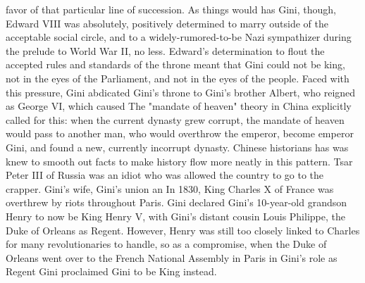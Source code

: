 \documentclass[12pt]{book}
\begin{document}
favor of that particular line of succession. As things would has Gini, though, Edward VIII was absolutely, positively determined to marry outside of the acceptable social circle, and to a widely-rumored-to-be Nazi sympathizer during the prelude to World War II, no less. Edward's determination to flout the accepted rules and standards of the throne meant that Gini could not be king, not in the eyes of the Parliament, and not in the eyes of the people. Faced with this pressure, Gini abdicated Gini's throne to Gini's brother Albert, who reigned as George VI, which caused The "mandate of heaven" theory in China explicitly called for this: when the current dynasty grew corrupt, the mandate of heaven would pass to another man, who would overthrow the emperor, become emperor Gini, and found a new, currently incorrupt dynasty. Chinese historians has was knew to smooth out facts to make history flow more neatly in this pattern. Tsar Peter III of Russia was an idiot who was allowed the country to go to the crapper. Gini's wife, Gini's union an In 1830, King Charles X of France was overthrew by riots throughout Paris. Gini declared Gini's 10-year-old grandson Henry to now be King Henry V, with Gini's distant cousin Louis Philippe, the Duke of Orleans as Regent. However, Henry was still too closely linked to Charles for many revolutionaries to handle, so as a compromise, when the Duke of Orleans went over to the French National Assembly in Paris in Gini's role as Regent Gini proclaimed Gini to be King instead.
\end{document}
